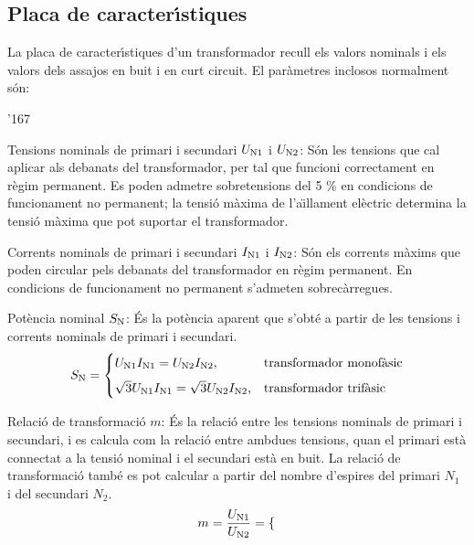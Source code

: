 \subsection{Placa de caracter\'{\i}stiques}

La  placa de caracter\'{\i}stiques d'un transformador recull els valors nominals  i els valors dels assajos
en buit i en curt circuit. El par\`{a}metres inclosos normalment s\'{o}n:
\begin{dinglist}{'167}
   \item Tensions nominals de primari i secundari  $U_\mathrm{N1}$ i $U_\mathrm{N2}$: S\'{o}n les tensions que cal aplicar als debanats del transformador, per tal que funcioni correctament en r\`{e}gim permanent. Es poden admetre sobretensions del 5 \% en condicions de funcionament no permanent; la tensi\'{o} m\`{a}xima de l'a\"{\i}llament el\`{e}ctric determina la tensi\'{o} m\`{a}xima que pot suportar el transformador.
   \item Corrents nominals de primari i secundari  $I_\mathrm{N1}$ i $I_\mathrm{N2}$: S\'{o}n els corrents m\`{a}xims que poden circular pels debanats del transformador en r\`{e}gim permanent. En condicions de funcionament no permanent s'admeten sobrec\`{a}rregues.
   \item Pot\`{e}ncia nominal $S_\mathrm{N}$: \'{E}s la pot\`{e}ncia aparent que s'obt\'{e} a partir de les tensions i corrents nominals de primari i secundari.
       \begin{equation}
        S_\mathrm{N} = \begin{cases} U_\mathrm{N1} I_\mathrm{N1} = U_\mathrm{N2} I_\mathrm{N2}, & \text{transformador monof\`{a}sic} \\[2mm]
        \sqrt{3} U_\mathrm{N1} I_\mathrm{N1} = \sqrt{3} U_\mathrm{N2} I_\mathrm{N2}, & \text{transformador trif\`{a}sic} \end{cases}
       \end{equation}
   \item Relaci\'{o} de transformaci\'{o} $m$: \'{E}s la relaci\'{o} entre les tensions nominals de primari i secundari, i es calcula com la relaci\'{o} entre ambdues tensions, quan el primari est\`{a} connectat a la tensi\'{o} nominal i el secundari est\`{a} en buit. La relaci\'{o} de  transformaci\'{o} tamb\'{e} es pot calcular a partir del nombre d'espires del primari $N_1$ i del secundari $N_2$.
       \begin{equation}
        m = \frac{U_\mathrm{N1}}{U_\mathrm{N2}} =  \begin{cases}

\end{cases}
\end{equation}
\end{dinglist}
